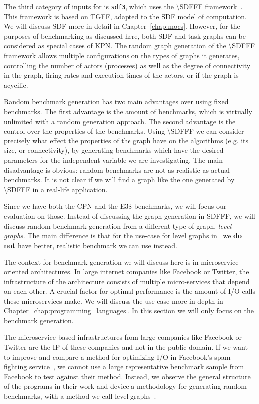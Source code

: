 The third category of inputs for \mocasin is \texttt{sdf3}, which uses the \ac{\SDFFF} framework~\cite{sdf3}.
This framework is based on \ac{TGFF}, adapted to the \ac{SDF} model of computation.
We will discuss \ac{SDF} more in detail in Chapter~\ref{chap:mocs}.
However, for the purposes of benchmarking as discussed here, both \ac{SDF} and task graphs can be considered as special cases of \ac{KPN}.
The random graph generation of the \ac{\SDFFF} framework allows multiple configurations on the types of graphs it generates, controlling the number of actors (processes) as well as the degree of connectivity in the graph, firing rates and execution times of the actors, or if the graph is acycilic.

Random benchmark generation has two main advantages over using fixed benchmarks. The first advantage is the amount of benchmarks, which is virtually unlimited with a random generation approach.
The second advantage is the control over the properties of the benchmarks.
Using \ac{\SDFFF} we can consider precisely what effect the properties of the graph have on the algorithms (e.g. its size, or connectivity), by generating benchmarks which have the desired parameters for the independent variable we are investigating.
The main disadvantage is obvious: random benchmarks are not as realistic as actual benchmarks.
It is not clear if we will find a graph like the one generated by \ac{\SDFFF} in a real-life application.

Since we have both the \ac{CPN} and the \ac{E3S} benchmarks, we will focus our evaluation on those.
Instead of discussing the graph generation in \ac{SDFFF}, we will discuss random benchmark generation from a different type of graph, \emph{level graphs}\cite{goens_multiprog18}.
The main difference is that for the use-case for level graphs in~\cite{goens_multiprog18} we \textbf{do not} have better, realistic benchmark we can use instead.

The context for benchmark generation we will discuss here is in microservice-oriented architectures.
In large internet companies like Facebook or Twitter, the infrastructure of the architecture consists of multiple micro-services that depend on each other.
A crucial factor for optimal performance is the amount of \ac{I/O} calls these microservices make.
We will discuss the use case more in-depth in Chapter~\ref{chap:programming_languages}. 
In this section we will only focus on the benchmark generation.

The microservice-based infrastructures from large companies like Facebook or Twitter are the \acf{IP} of these companies and not in the public domain.
If we want to improve and compare a method for optimizing \ac{I/O} in Facebook's spam-fighting service~\cite{marlow2014haxl}, we cannot use a large representative benchmark sample from Facebook to test against their method.
Instead, we observe the general structure of the programs in their work and device a methodology for generating random benchmarks, with a method we call level graphs~\cite{goens_multiprog18}.

